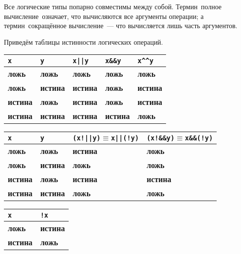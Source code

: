 \documentclass[10pt]{report}
\begin{document}
Все логические типы попарно совместимы между собой. Термин\ \glqq полное вычисление\grqq\ означает, что вычисляются все аргументы операции; а термин\ \glqq сокращённое
вычисление\grqq\ --- что вычисляется лишь часть аргументов.

Приведём таблицы истинности логических операций.
\begin{center}
\vspace{5mm}
\begin{longtable}{|l|l|l|l|l|}  \hline
\texttt{x}          & \texttt{y}        & \texttt{x||y}     & \texttt{x\&\&y}   & \texttt{x\^{ }\^{ }y} \\  \hline
\textbf{ложь}       & \textbf{ложь}     & \textbf{ложь}     & \textbf{ложь}     & \textbf{ложь}         \\  \hline
\textbf{ложь}       & \textbf{истина}   & \textbf{истина}   & \textbf{ложь}     & \textbf{истина}       \\  \hline
\textbf{истина}     & \textbf{ложь}     & \textbf{истина}   & \textbf{ложь}     & \textbf{истина}       \\  \hline
\textbf{истина}     & \textbf{истина}   & \textbf{истина}   & \textbf{истина}   & \textbf{ложь}         \\  \hline
\end{longtable}

\begin{longtable}{|l|l|l|l|}  \hline
\texttt{x}          & \texttt{y}        & \texttt{(x!||y)$\equiv$x||(!y)}   & \texttt{(x!\&\&y)$\equiv$x\&\&(!y)}   \\  \hline
\textbf{ложь}       & \textbf{ложь}     & \textbf{истина}                   & \textbf{ложь}                         \\  \hline
\textbf{ложь}       & \textbf{истина}   & \textbf{ложь}                     & \textbf{ложь}                         \\  \hline
\textbf{истина}     & \textbf{ложь}     & \textbf{истина}                   & \textbf{истина}                       \\  \hline
\textbf{истина}     & \textbf{истина}   & \textbf{ложь}                     & \textbf{ложь}                         \\  \hline
\end{longtable}


\begin{longtable}{|l|l|}  \hline
 \texttt{x}         & \texttt{!x}       \\  \hline
\textbf{ложь}       & \textbf{истина}   \\  \hline
\textbf{истина}     & \textbf{ложь}     \\  \hline
\end{longtable}
\end{center}
\end{document}
